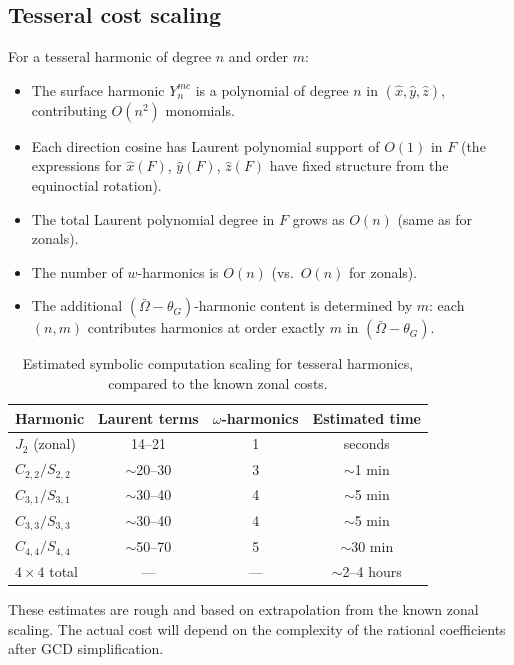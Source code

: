 \documentclass[11pt]{article}
\begin{document}
\subsection{Tesseral cost scaling}

For a tesseral harmonic of degree $n$ and order $m$:
\begin{itemize}
\item The surface harmonic $Y_n^{mc}$ is a polynomial of degree $n$ in
$(\hat x, \hat y, \hat z)$, contributing $O(n^2)$ monomials.
\item Each direction cosine has Laurent polynomial support of $O(1)$ in
$F$ (the expressions for $\hat x(F)$, $\hat y(F)$, $\hat z(F)$ have
fixed structure from the equinoctial rotation).
\item The total Laurent polynomial degree in $F$ grows as $O(n)$
(same as for zonals).
\item The number of $w$-harmonics is $O(n)$ (vs.\ $O(n)$ for zonals).
\item The additional $(\bar\Omega - \theta_G)$-harmonic content is
determined by $m$: each $(n,m)$ contributes harmonics at order exactly $m$
in $(\bar\Omega - \theta_G)$.
\end{itemize}

\begin{table}[ht]
\centering
\caption{Estimated symbolic computation scaling for tesseral harmonics,
compared to the known zonal costs.}
\label{tab:tesseral_cost}
\small
\begin{tabular}{@{}lccc@{}}
\toprule
Harmonic & Laurent terms & $\omega$-harmonics & Estimated time \\
\midrule
$J_2$ (zonal) & 14--21 & 1 & seconds \\
$C_{2,2}/S_{2,2}$ & $\sim$20--30 & 3 & $\sim$1 min \\
$C_{3,1}/S_{3,1}$ & $\sim$30--40 & 4 & $\sim$5 min \\
$C_{3,3}/S_{3,3}$ & $\sim$30--40 & 4 & $\sim$5 min \\
$C_{4,4}/S_{4,4}$ & $\sim$50--70 & 5 & $\sim$30 min \\
\midrule
$4 \times 4$ total & --- & --- & $\sim$2--4 hours \\
\bottomrule
\end{tabular}
\end{table}

These estimates are rough and based on extrapolation from the known zonal
scaling. The actual cost will depend on the complexity of the rational
coefficients after GCD simplification.
\end{document}
